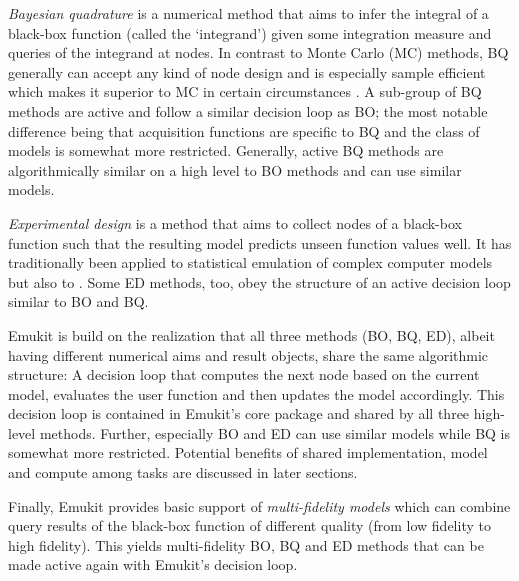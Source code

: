 \emph{Bayesian quadrature} \cite{Diaconis1988, OHagan1992, pnbook22} is a numerical method that aims to infer the integral of a black-box function (called the `integrand') given some integration measure and queries of the integrand at nodes. In contrast to Monte Carlo (MC) methods, BQ generally can accept any kind of node design and is especially sample efficient which makes it superior to MC in certain circumstances \cite{RasmussenGhahramani2002}. A sub-group of BQ methods are active and follow a similar decision loop as BO; the most notable difference being that acquisition functions are specific to BQ and the class of models is somewhat more restricted. Generally, active BQ methods are algorithmically similar on a high level to BO methods and can use similar models.

\emph{Experimental design} \cite{Kennedy2000, Kennedy2001, Conti2009, Conti2010} is a method that aims to collect nodes of a black-box function such that the resulting model predicts unseen function values well. It has traditionally been applied to statistical emulation of complex computer models but also to . Some ED methods, too, obey the structure of an active decision loop similar to BO and BQ.

Emukit is build on the realization that all three methods (BO, BQ, ED), albeit having different numerical aims and result objects, share the same algorithmic structure: A decision loop that computes the next node based on the current model, evaluates the user function and then updates the model accordingly. This decision loop is contained in Emukit's core package and shared by all three high-level methods.
Further, especially BO and ED can use similar models while BQ is somewhat more restricted. Potential benefits of shared implementation, model and compute among tasks are discussed in later sections.

Finally, Emukit provides basic support of \emph{multi-fidelity models} \cite{Peherstorfer2017} which can combine query results of the black-box function of different quality (from low fidelity to high fidelity). This yields multi-fidelity BO, BQ and ED methods that can be made active again with Emukit's decision loop.



